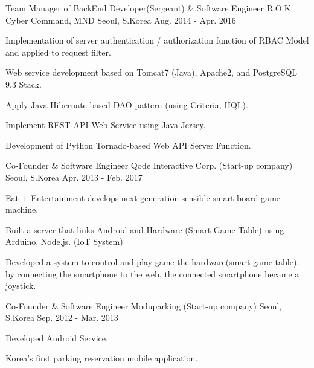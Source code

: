 \begin{cventries}
  \cventry
    {Team Manager of BackEnd Developer(Sergeant) \& Software Engineer} %
    {R.O.K Cyber Command, MND } %
    {Seoul, S.Korea} %
    {Aug. 2014 - Apr. 2016} %
    {
      \begin{cvitems} %
        \item {Implementation of server authentication / authorization function of RBAC Model and applied to request filter.}
        \item {Web service development based on Tomcat7 (Java), Apache2, and PostgreSQL 9.3 Stack.}
        \item {Apply Java Hibernate-based DAO pattern (using Criteria, HQL).}
        \item {Implement REST API Web Service using Java Jersey.}
        \item {Development of Python Tornado-based Web API Server Function.}
      \end{cvitems}
    }

  \cventry
    {Co-Founder \& Software Engineer} %
    {Qode Interactive Corp. (Start-up company)} %
    {Seoul, S.Korea} %
    {Apr. 2013 - Feb. 2017} %
    {
      \begin{cvitems} %
        \item {Eat + Entertainment develops next-generation sensible smart board game machine.}
        \item {Built a server that links Android and Hardware (Smart Game Table) using Arduino, Node.js. (IoT System)}
        \item {Developed a system to control and play game the hardware(smart game table). by connecting the smartphone to the web, the connected smartphone became a joystick.}
      \end{cvitems}
    }

  \cventry
    {Co-Founder \& Software Engineer} %
    {Moduparking (Start-up company)} %
    {Seoul, S.Korea} %
    {Sep. 2012 - Mar. 2013} %
    {
      \begin{cvitems} %
        \item {Developed Android Service.}
        \item {Korea's first parking reservation mobile application.}
      \end{cvitems}
    }

\end{cventries}
